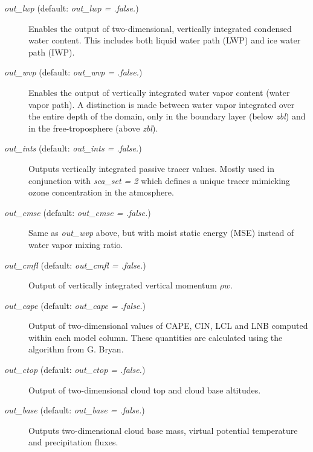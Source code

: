 \documentclass[12pt,A4,french]{article}
\begin{document}
\begin{description}

\item[{\it out\_lwp} (default: {\it out\_lwp = .false.})]

Enables the output of two-dimensional, vertically integrated condensed water content. This includes both liquid water path (LWP) and ice water path (IWP).

\item[{\it out\_wvp} (default: {\it out\_wvp = .false.})]

Enables the output of vertically integrated water vapor content (water vapor path). A distinction is made between water vapor integrated over the entire depth of the domain, only in the boundary layer (below {\it zbl}) and in the free-troposphere (above {\it zbl}). 

\item[{\it out\_ints} (default: {\it out\_ints = .false.})]

Outputs vertically integrated passive tracer values. Mostly used in conjunction with {\it sca\_set = 2} which defines a unique tracer mimicking ozone concentration in the atmosphere.

\item[{\it out\_cmse} (default: {\it out\_cmse = .false.})]

Same as {\it out\_wvp} above, but with moist static energy (MSE) instead of water vapor mixing ratio.

\item[{\it out\_cmfl} (default: {\it out\_cmfl = .false.})]

Output of vertically integrated vertical momentum $\rho w$. 

\item[{\it out\_cape} (default: {\it out\_cape = .false.})]

Output of two-dimensional values of CAPE, CIN, LCL and LNB computed within each model column. These quantities are calculated using the algorithm from G. Bryan.

\item[{\it out\_ctop} (default: {\it out\_ctop = .false.})]

Output of two-dimensional cloud top and cloud base altitudes. 

\item[{\it out\_base} (default: {\it out\_base = .false.})]

Outputs two-dimensional cloud base mass, virtual potential temperature and precipitation fluxes.


\end{description}
\end{document}

